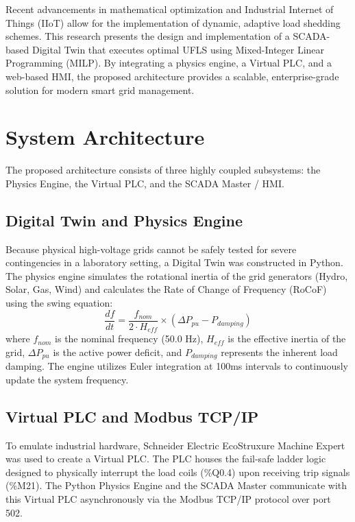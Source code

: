 \documentclass[conference]{IEEEtran}
\begin{document}
Recent advancements in mathematical optimization and Industrial Internet of Things (IIoT) allow for the implementation of dynamic, adaptive load shedding schemes. This research presents the design and implementation of a SCADA-based Digital Twin that executes optimal UFLS using Mixed-Integer Linear Programming (MILP). By integrating a physics engine, a Virtual PLC, and a web-based HMI, the proposed architecture provides a scalable, enterprise-grade solution for modern smart grid management.

\section{System Architecture}
The proposed architecture consists of three highly coupled subsystems: the Physics Engine, the Virtual PLC, and the SCADA Master / HMI.

\subsection{Digital Twin and Physics Engine}
Because physical high-voltage grids cannot be safely tested for severe contingencies in a laboratory setting, a Digital Twin was constructed in Python. The physics engine simulates the rotational inertia of the grid generators (Hydro, Solar, Gas, Wind) and calculates the Rate of Change of Frequency (RoCoF) using the swing equation:
\begin{equation}
\frac{df}{dt} = \frac{f_{nom}}{2 \cdot H_{eff}} \times (\Delta P_{pu} - P_{damping}) \label{eq:rocof}
\end{equation}
where $f_{nom}$ is the nominal frequency (50.0 Hz), $H_{eff}$ is the effective inertia of the grid, $\Delta P_{pu}$ is the active power deficit, and $P_{damping}$ represents the inherent load damping. The engine utilizes Euler integration at 100ms intervals to continuously update the system frequency.

\subsection{Virtual PLC and Modbus TCP/IP}
To emulate industrial hardware, Schneider Electric EcoStruxure Machine Expert was used to create a Virtual PLC. The PLC houses the fail-safe ladder logic designed to physically interrupt the load coils (\%Q0.4) upon receiving trip signals (\%M21). The Python Physics Engine and the SCADA Master communicate with this Virtual PLC asynchronously via the Modbus TCP/IP protocol over port 502.
\end{document}
